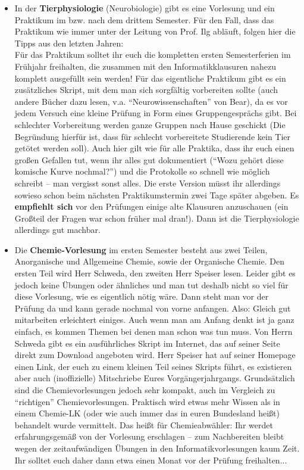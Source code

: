 \begin{itemize}
\item In der \textbf{Tierphysiologie} (Neurobiologie) gibt es eine Vorlesung und ein
     Praktikum im bzw. nach dem drittem Semester. Für den Fall, dass das Praktikum wie immer unter der Leitung von Prof. Ilg abläuft, folgen hier die Tipps aus den letzten Jahren:\\
     Für das Praktikum solltet
     ihr euch die kompletten ersten Semesterferien im Frühjahr freihalten, die zusammen
     mit den Informatikklausuren nahezu komplett ausgefüllt sein werden!
     Für das eigentliche Praktikum gibt es ein zusätzliches Skript, mit
     dem man sich sorgfältig vorbereiten sollte (auch andere Bücher
     dazu lesen, v.a. "`Neurowissenschaften"' von Bear), da es vor jedem Versuch eine kleine
     Prüfung in Form eines Gruppengesprächs gibt.  Bei schlechter
     Vorbereitung werden ganze Gruppen nach Hause geschickt (Die
     Begründung hierfür ist, dass für schlecht vorbereitete
     Studierende kein Tier getötet werden soll\textellipsis).  Auch hier gilt
     wie für alle Praktika, dass ihr euch einen großen Gefallen
     tut, wenn ihr alles gut dokumentiert ("`Wozu gehört diese
     komische Kurve nochmal?"') und die Protokolle so schnell wie
     möglich schreibt -- man vergisst
     sonst alles.  Die erste Version müsst ihr allerdings sowieso
     schon beim nächsten Praktikumstermin zwei Tage später
     abgeben. Es \textbf{empfiehlt sich} vor den Prüfungen einige alte Klausuren
     anzuschauen (ein Großteil der Fragen war schon früher mal dran!).
     Dann ist die Tierphysiologie allerdings gut machbar.

 \item Die \textbf{Chemie-Vorlesung} im ersten Semester besteht aus zwei Teilen,
     Anorganische und Allgemeine Chemie, sowie der Organische Chemie. Den ersten
     Teil wird Herr Schweda, den zweiten Herr Speiser lesen.
     Leider gibt es jedoch keine Übungen oder ähnliches und man tut deshalb nicht so
     viel für diese Vorlesung, wie es eigentlich nötig wäre.
     Dann steht man vor der Prüfung da
     und kann gerade nochmal von vorne anfangen. Also: Gleich gut
     mitarbeiten erleichtert einiges. Auch wenn man am Anfang denkt
     ist ja ganz einfach, es kommen Themen bei denen man schon was tun
     muss.
     Von Herrn Schweda gibt es ein ausführliches Skript im Internet, das auf seiner Seite
     direkt zum Download angeboten wird. Herr Speiser hat auf seiner Homepage einen Link,
     der euch zu einem kleinen Teil seines Skripts führt, es existieren aber auch (inoffizielle)
     Mitschriebe Eures Vorgängerjahrgangs.
     Grundsätzlich sind die Chemievorlesungen jedoch sehr kompakt, auch im
     Vergleich zu "`richtigen"' Chemievorlesungen. Praktisch wird etwas mehr
     Wissen als in einem Chemie-LK (oder wie auch immer das in euren Bundesland heißt)
     behandelt wurde vermittelt. Das heißt für Chemieabwähler: Ihr werdet
     erfahrungsgemäß von der Vorlesung erschlagen -- zum Nachbereiten bleibt
     wegen der zeitaufwändigen Übungen in den Informatikvorlesungen kaum Zeit.
     Ihr solltet euch daher dann etwa einen Monat vor der Prüfung freihalten...


\end{itemize}
